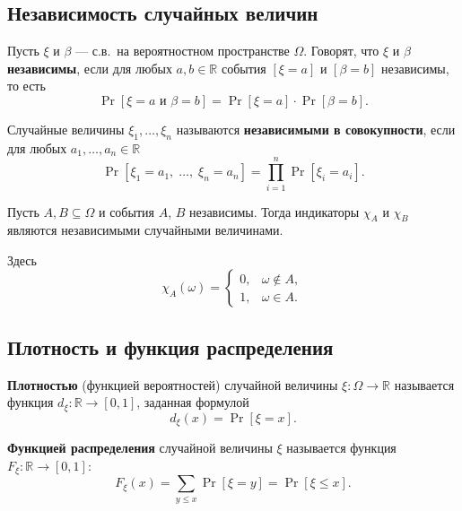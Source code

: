 \subsection{Независимость случайных величин}

\begin{Definition}{}{}
	Пусть $\xi$ и $\beta$ — с.в.\ на вероятностном пространстве $\Omega$. Говорят, что $\xi$ и $\beta$ \textbf{независимы}, если для любых $a, b \in \mathbb{R}$ события $[\xi = a]$ и $[\beta = b]$ независимы, то есть
	\[
	\Pr[\xi = a \text{ и } \beta = b] = \Pr[\xi = a] \cdot \Pr[\beta = b].
	\]
\end{Definition}

\begin{Definition}{}{}
	Случайные величины $\xi_1, \ldots, \xi_n$ называются \textbf{независимыми в совокупности}, если для любых $a_1, \ldots, a_n \in \mathbb{R}$
	\[
	\Pr[\xi_1 = a_1,\; \ldots,\; \xi_n = a_n] = \prod_{i=1}^{n} \Pr[\xi_i = a_i].
	\]
\end{Definition}

\begin{Statement}{}{}
	Пусть $A, B \subseteq \Omega$ и события $A$, $B$ независимы. Тогда индикаторы $\chi_A$ и $\chi_B$ являются независимыми случайными величинами.
	
	Здесь
	\[
	\chi_A(\omega) = \begin{cases} 0, & \omega \notin A, \\ 1, & \omega \in A. \end{cases}
	\]
\end{Statement}

\subsection{Плотность и функция распределения}

\begin{Definition}{}{}
	\textbf{Плотностью} (функцией вероятностей) случайной величины $\xi \colon \Omega \to \mathbb{R}$ называется функция $d_\xi \colon \mathbb{R} \to [0,1]$, заданная формулой
	\[
	d_\xi(x) = \Pr[\xi = x].
	\]
\end{Definition}

\begin{Definition}{}{}
	\textbf{Функцией распределения} случайной величины $\xi$ называется функция $F_\xi \colon \mathbb{R} \to [0,1]$:
	\[
	F_\xi(x) = \sum_{y \leq x} \Pr[\xi = y] = \Pr[\xi \leq x].
	\]
\end{Definition}

